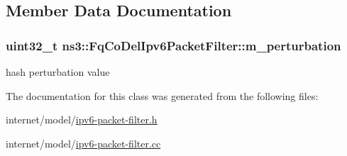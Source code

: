 \subsection{Member Data Documentation}
\subsubsection[{\texorpdfstring{m\+\_\+perturbation}{m_perturbation}}]{\setlength{\rightskip}{0pt plus 5cm}uint32\+\_\+t ns3\+::\+Fq\+Co\+Del\+Ipv6\+Packet\+Filter\+::m\+\_\+perturbation\hspace{0.3cm}{\ttfamily [private]}}\hypertarget{classns3_1_1FqCoDelIpv6PacketFilter_a4382a90472f0a49ba6e5def5a259f10e}{}\label{classns3_1_1FqCoDelIpv6PacketFilter_a4382a90472f0a49ba6e5def5a259f10e}


hash perturbation value 



The documentation for this class was generated from the following files\+:\begin{DoxyCompactItemize}
\item 
internet/model/\hyperlink{ipv6-packet-filter_8h}{ipv6-\/packet-\/filter.\+h}\item 
internet/model/\hyperlink{ipv6-packet-filter_8cc}{ipv6-\/packet-\/filter.\+cc}\end{DoxyCompactItemize}
